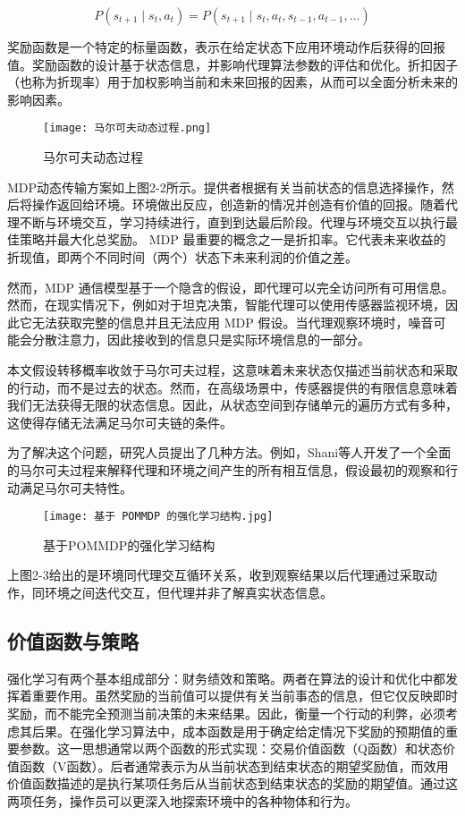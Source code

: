 \[
P(s_{t+1} \mid s_t, a_t) = P(s_{t+1} \mid s_t, a_t, s_{t-1}, a_{t-1}, \ldots)
\]

奖励函数是一个特定的标量函数，表示在给定状态下应用环境动作后获得的回报值。奖励函数的设计基于状态信息，并影响代理算法参数的评估和优化。折扣因子（也称为折现率）用于加权影响当前和未来回报的因素，从而可以全面分析未来的影响因素。

\begin{figure}[hbt]
	\centering
	\texttt{[image: 马尔可夫动态过程.png]}
	\caption{马尔可夫动态过程}
	\label{f.example}
\end{figure}

MDP动态传输方案如上图2-2所示。提供者根据有关当前状态的信息选择操作，然后将操作返回给环境。环境做出反应，创造新的情况并创造有价值的回报。随着代理不断与环境交互，学习持续进行，直到到达最后阶段。代理与环境交互以执行最佳策略并最大化总奖励。 MDP 最重要的概念之一是折扣率。它代表未来收益的折现值，即两个不同时间（两个）状态下未来利润的价值之差。

然而，MDP 通信模型基于一个隐含的假设，即代理可以完全访问所有可用信息。然而，在现实情况下，例如对于坦克决策，智能代理可以使用传感器监视环境，因此它无法获取完整的信息并且无法应用 MDP 假设。当代理观察环境时，噪音可能会分散注意力，因此接收到的信息只是实际环境信息的一部分。

本文假设转移概率收敛于马尔可夫过程，这意味着未来状态仅描述当前状态和采取的行动，而不是过去的状态。然而，在高级场景中，传感器提供的有限信息意味着我们无法获得无限的状态信息。因此，从状态空间到存储单元的遍历方式有多种，这使得存储无法满足马尔可夫链的条件。

为了解决这个问题，研究人员提出了几种方法。例如，Shani\cite{shani2013survey}等人开发了一个全面的马尔可夫过程来解释代理和环境之间产生的所有相互信息，假设最初的观察和行动满足马尔可夫特性。

\begin{figure}[hbt]
	\centering
	\texttt{[image: 基于 POMMDP 的强化学习结构.jpg]}
	\caption{基于POMMDP的强化学习结构}
	\label{f.example}
\end{figure}

上图2-3给出的是环境同代理交互循环关系，收到观察结果以后代理通过采取动作，同环境之间迭代交互，但代理并非了解真实状态信息。

\subsection{价值函数与策略}


强化学习有两个基本组成部分：财务绩效和策略。两者在算法的设计和优化中都发挥着重要作用。虽然奖励的当前值可以提供有关当前事态的信息，但它仅反映即时奖励，而不能完全预测当前决策的未来结果。因此，衡量一个行动的利弊，必须考虑其后果。在强化学习算法中，成本函数是用于确定给定情况下奖励的预期值的重要参数。这一思想通常以两个函数的形式实现：交易价值函数（Q函数）和状态价值函数（V函数）。后者通常表示为从当前状态到结束状态的期望奖励值，而效用价值函数描述的是执行某项任务后从当前状态到结束状态的奖励的期望值。通过这两项任务，操作员可以更深入地探索环境中的各种物体和行为。


